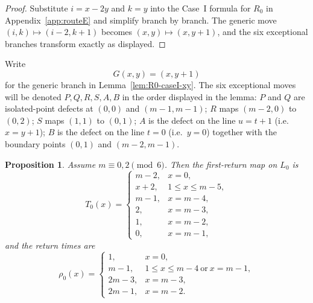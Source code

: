 \documentclass[11pt]{article}
\newtheorem{proposition}{Proposition}
\begin{document}
\begin{proof}
Substitute $i=x-2y$ and $k=y$ into the Case~I formula for $R_0$ in Appendix~\ref{app:routeE} and simplify branch by
branch.
The generic move $(i,k)\mapsto(i-2,k+1)$ becomes $(x,y)\mapsto(x,y+1)$, and the six exceptional
branches transform exactly as displayed.
\end{proof}

Write
\[
G(x,y)=(x,y+1)
\]
for the generic branch in Lemma~\ref{lem:R0-caseI-xy}.
The six exceptional moves will be denoted $P,Q,R,S,A,B$ in the order displayed in the lemma:
$P$ and $Q$ are isolated-point defects at $(0,0)$ and $(m-1,m-1)$;
$R$ maps $(m-2,0)$ to $(0,2)$;
$S$ maps $(1,1)$ to $(0,1)$;
$A$ is the defect on the line $u=t+1$ (i.e.\ $x=y+1$);
$B$ is the defect on the line $t=0$ (i.e.\ $y=0$) together with the boundary points $(0,1)$ and $(m-2,m-1)$.

\begin{proposition}\label{prop:R0-caseI-data}
Assume $m\equiv 0,2\pmod 6$.
Then the first-return map on $L_0$ is
\[
T_0(x)=
\begin{cases}
m-2,&x=0,\\
x+2,&1\le x\le m-5,\\
m-1,&x=m-4,\\
2,&x=m-3,\\
1,&x=m-2,\\
0,&x=m-1,
\end{cases}
\]
and the return times are
\[
\rho_0(x)=
\begin{cases}
1,&x=0,\\
m-1,&1\le x\le m-4\ \text{or}\ x=m-1,\\
2m-3,&x=m-3,\\
2m-1,&x=m-2.
\end{cases}
\]
\end{proposition}
\end{document}
